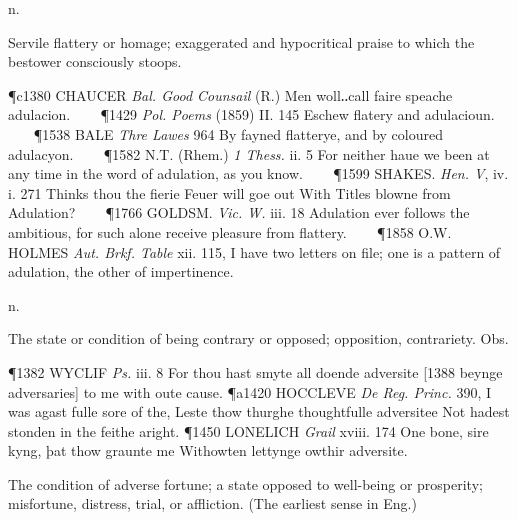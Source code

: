 \begin{description}[wide, labelwidth=!, labelindent=0pt]
  n.

\noindent  {}


\noindent  
Servile flattery or homage; exaggerated and hypocritical praise to which the bestower consciously stoops. 

\P c1380 CHAUCER \textit{Bal. Good Counsail} (R.) Men woll‥call faire speache adulacion.    
\P 1429 \textit{Pol. Poems} (1859) II. 145 Eschew flatery and adulacioun.    
\P 1538 BALE \textit{Thre Lawes} 964 By fayned flatterye, and by coloured adulacyon.    
\P 1582 N.T. (Rhem.) \textit{1 Thess.} ii. 5 For neither haue we been at any time in the word of adulation, as you know.    
\P 1599 SHAKES. \textit{Hen. V}, iv. i. 271 Thinks thou the fierie Feuer will goe out With Titles blowne from Adulation?    
\P 1766 GOLDSM. \textit{Vic. W.} iii. 18 Adulation ever follows the ambitious, for such alone receive pleasure from flattery.    
\P 1858 O.W. HOLMES \textit{Aut. Brkf. Table} xii. 115, I have two letters on file; one is a pattern of adulation, the other of impertinence.


  n.

\noindent  {}

\vspace{-0.3cm}

\begin{myenumerate}
 The state or condition of being contrary or opposed; opposition, contrariety. Obs. 

\P 1382 WYCLIF \textit{Ps.} iii. 8 For thou hast smyte all doende adversite [1388 beynge adversaries] to me with oute cause.
\P a1420 HOCCLEVE \textit{De Reg. Princ.} 390, I was agast fulle sore of the, Leste thow thurghe thoughtfulle adversitee Not hadest stonden in the feithe aright.
\P 1450 LONELICH \textit{Grail} xviii. 174 One bone, sire kyng, þat thow graunte me Withowten lettynge owthir adversite.

 The condition of adverse fortune; a state opposed to well-being or prosperity; misfortune, distress, trial, or affliction. (The earliest sense in Eng.) 


\end{myenumerate}
\end{description}
